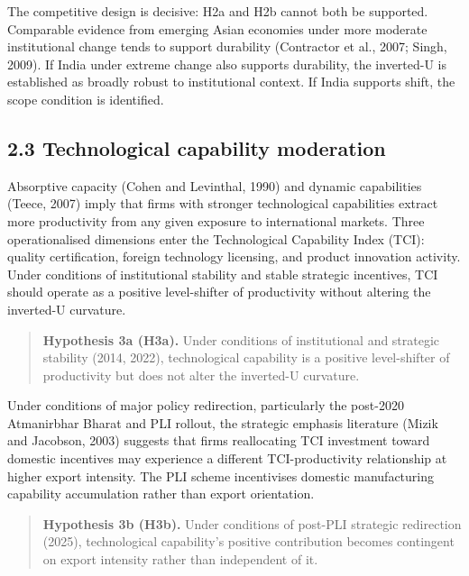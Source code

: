 \documentclass[
  12pt]{article}
\begin{document}
The competitive design is decisive: H2a and H2b cannot both be
supported. Comparable evidence from emerging Asian economies under more
moderate institutional change tends to support durability (Contractor et
al., 2007; Singh, 2009). If India under extreme change also supports
durability, the inverted-U is established as broadly robust to
institutional context. If India supports shift, the scope condition is
identified.

\hypertarget{technological-capability-moderation}{%
\subsection{2.3 Technological capability
moderation}\label{technological-capability-moderation}}

Absorptive capacity (Cohen and Levinthal, 1990) and dynamic capabilities
(Teece, 2007) imply that firms with stronger technological capabilities
extract more productivity from any given exposure to international
markets. Three operationalised dimensions enter the Technological
Capability Index (TCI): quality certification, foreign technology
licensing, and product innovation activity. Under conditions of
institutional stability and stable strategic incentives, TCI should
operate as a positive level-shifter of productivity without altering the
inverted-U curvature.

\begin{quote}
\textbf{Hypothesis 3a (H3a).} Under conditions of institutional and
strategic stability (2014, 2022), technological capability is a positive
level-shifter of productivity but does not alter the inverted-U
curvature.
\end{quote}

Under conditions of major policy redirection, particularly the post-2020
Atmanirbhar Bharat and PLI rollout, the strategic emphasis literature
(Mizik and Jacobson, 2003) suggests that firms reallocating TCI
investment toward domestic incentives may experience a different
TCI-productivity relationship at higher export intensity. The PLI scheme
incentivises domestic manufacturing capability accumulation rather than
export orientation.

\begin{quote}
\textbf{Hypothesis 3b (H3b).} Under conditions of post-PLI strategic
redirection (2025), technological capability's positive contribution
becomes contingent on export intensity rather than independent of it.
\end{quote}
\end{document}
